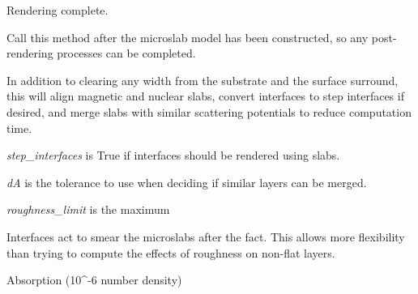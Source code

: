 \documentclass[letterpaper,10pt,english]{sphinxmanual}
\begin{document}
\begin{fulllineitems}
\begin{fulllineitems}
\end{fulllineitems}


\begin{fulllineitems}
\label{api/profile:refl1d.profile.Microslabs.finalize}
Rendering complete.

Call this method after the microslab model has been constructed,
so any post-rendering processes can be completed.

In addition to clearing any width from the substrate and
the surface surround, this will align magnetic and nuclear slabs,
convert interfaces to step interfaces if desired, and merge slabs
with similar scattering potentials to reduce computation time.

\emph{step\_interfaces} is True if interfaces should be rendered using
slabs.

\emph{dA} is the tolerance to use when deciding if similar layers can
be merged.

\emph{roughness\_limit} is the maximum

\end{fulllineitems}


\begin{fulllineitems}
\label{api/profile:refl1d.profile.Microslabs.interface}
Interfaces act to smear the microslabs after the fact.  This
allows more flexibility than trying to compute the effects
of roughness on non-flat layers.

\end{fulllineitems}


\begin{fulllineitems}
\label{api/profile:refl1d.profile.Microslabs.irho}
Absorption (10\textasciicircum{}-6 number density)

\end{fulllineitems}


\begin{fulllineitems}
\label{api/profile:refl1d.profile.Microslabs.ismagnetic}
\end{fulllineitems}


\end{fulllineitems}
\end{document}
